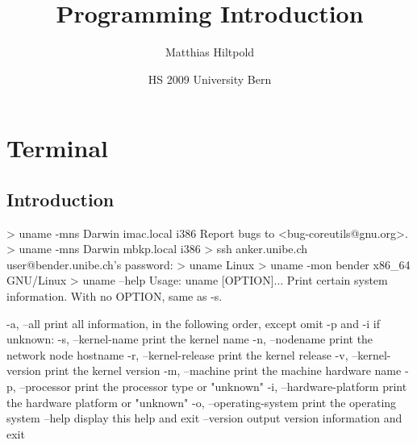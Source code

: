 \documentclass[10pt,a4paper]{scrartcl}
\date{HS 2009 University Bern}
\author{Matthias Hiltpold}
\title{Programming Introduction}
\begin{document}
\maketitle

\tableofcontents

\newpage


\section{Terminal}
\subsection{Introduction}
\begin{terminalcode}
> uname -mns
  Darwin imac.local i386
  Report bugs to <bug-coreutils@gnu.org>.
> uname -mns
  Darwin mbkp.local i386
> ssh anker.unibe.ch
  user@bender.unibe.ch's password: 
> uname
  Linux
> uname -mon
  bender x86_64 GNU/Linux
> uname --help
  Usage: uname [OPTION]...
  Print certain system information.  With no OPTION, same as -s.
  
    -a, --all                print all information, in the following order,
                               except omit -p and -i if unknown:
    -s, --kernel-name        print the kernel name
    -n, --nodename           print the network node hostname
    -r, --kernel-release     print the kernel release
    -v, --kernel-version     print the kernel version
    -m, --machine            print the machine hardware name
    -p, --processor          print the processor type or "unknown"
    -i, --hardware-platform  print the hardware platform or "unknown"
    -o, --operating-system   print the operating system
        --help     display this help and exit
        --version  output version information and exit
\end{terminalcode}

\end{document}
